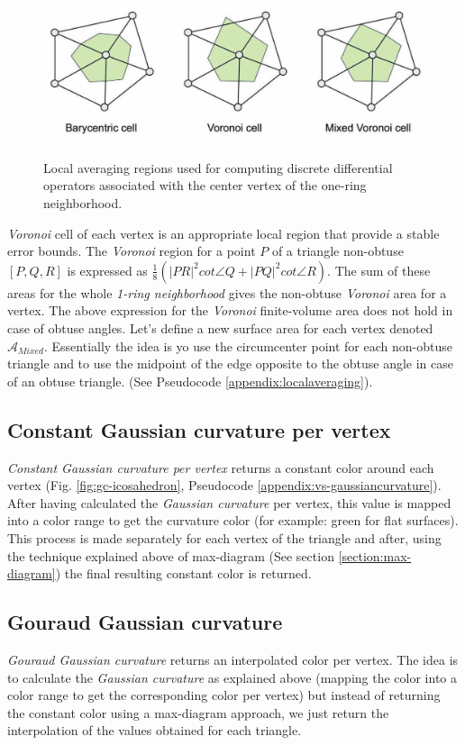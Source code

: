 \begin{figure}[!h]
    \centering
    \includegraphics[scale=0.35]{images/localregions.png}
    \label{fig:localregions}
    \caption{Local averaging regions used for computing discrete differential operators associated with the center vertex of the one-ring neighborhood. \cite{polygonmeshprocessing}}
\end{figure}
\textit{Voronoi} cell of each vertex is an appropriate local region that provide a stable error bounds.
The \textit{Voronoi} region for a point $P$ of a triangle non-obtuse $[P, Q, R]$ is expressed as $\frac{1}{8}(| PR|^2 cot \angle Q + |PQ |^2 cot \angle R)$. The sum of these areas for the whole \textit{1-ring neighborhood} gives the non-obtuse \textit{Voronoi} area for a vertex. The above expression for the \textit{Voronoi} finite-volume area does not hold in case of obtuse angles. Let's define a new surface area for each vertex denoted $\mathcal{A}_{Mixed}$. Essentially the idea is yo use the circumcenter point for each non-obtuse triangle and to use the midpoint of the edge opposite to the obtuse angle in case of an obtuse triangle. (See Pseudocode \ref{appendix:localaveraging}). \cite{meshlab}

\subsection{Constant Gaussian curvature per vertex}
\textit{Constant Gaussian curvature per vertex} returns a constant color around each vertex (Fig. \ref{fig:gc-icosahedron}, Pseudocode \ref{appendix:vs-gaussiancurvature}). After having calculated the \textit{Gaussian curvature} per vertex, this value is mapped into a color range to get the curvature color (for example: green for flat surfaces). This process is made separately for each vertex of the triangle and after, using the technique explained above of max-diagram (See section \ref{section:max-diagram}) the final resulting constant color is returned.

\subsection{Gouraud Gaussian curvature}
\textit{Gouraud Gaussian curvature} returns an interpolated color per vertex. The idea is to calculate the \textit{Gaussian curvature} as explained above (mapping the color into a color range to get the corresponding color per vertex) but instead of returning the constant color using a max-diagram approach, we just return the interpolation of the values obtained for each triangle.



